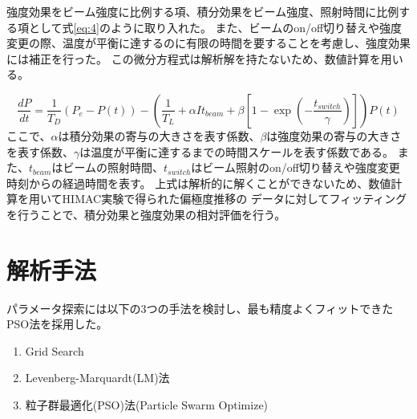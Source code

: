 強度効果をビーム強度に比例する項、積分効果をビーム強度、照射時間に比例する項として式\ref{eq:4}のように取り入れた。
また、ビームのon/off切り替えや強度変更の際、温度が平衡に達するのに有限の時間を要することを考慮し、強度効果には補正を行った。
この微分方程式は解析解を持たないため、数値計算を用いる。

\begin{equation}
  \frac{dP}{dt}=\frac{1}{T_D}(P_e-P(t))-\left(\frac{1}{T_L}+\alpha I t_{beam}+\beta\left[1-\exp\left(-\frac{t_{switch}}{\gamma}\right)\right]\right)P(t)
  \label{eq:4}
\end{equation}
ここで、$\alpha$は積分効果の寄与の大きさを表す係数、$\beta$は強度効果の寄与の大きさを表す係数、$\gamma$は温度が平衡に達するまでの時間スケールを表す係数である。
また、$t_{beam}$はビームの照射時間、$t_{switch}$はビーム照射のon/off切り替えや強度変更時刻からの経過時間を表す。
上式は解析的に解くことができないため、数値計算を用いてHIMAC実験で得られた偏極度推移の
データに対してフィッティングを行うことで、積分効果と強度効果の相対評価を行う。

\section{解析手法}
パラメータ探索には以下の3つの手法を検討し、最も精度よくフィットできたPSO法を採用した。
\begin{enumerate}
  \item Grid Search
  \item Levenberg-Marquardt(LM)法
  \item 粒子群最適化(PSO)法(Particle Swarm Optimize)
\end{enumerate}



